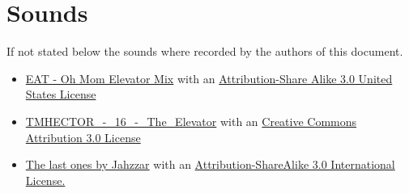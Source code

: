 \documentclass[12pt]{article}
\begin{document}
\section{Sounds}
If not stated below the sounds where recorded by the authors of this document.
\begin{itemize}
\item \href{http://freemusicarchive.org/music/EAT/20100129104001364/Oh_Mom_Elevator_Mix}{EAT - Oh Mom Elevator Mix} with an \href{http://creativecommons.org/licenses/by-sa/3.0/us/}{Attribution-Share Alike 3.0 United States License}
\item \href{http://freemusicarchive.org/music/TMHECTOR/The_Haunted_Mansion/DS10Forumcom\_-\_DS10Forumcom\_-\_The_Haunted_Mansion\_-\_16\_The\_Elevator}{TMHECTOR\_-\_16\_-\_The\_Elevator} with an \href{http://creativecommons.org/licenses/by/3.0/}{Creative Commons Attribution 3.0 License}
\item \href{http://freemusicarchive.org/music/Jahzzar/Smoke_Factory/The_last_ones}{The last ones by Jahzzar} with an \href{http://creativecommons.org/licenses/by-sa/3.0/}{Attribution-ShareAlike 3.0 International License.}
\end{itemize}





\end{document}
